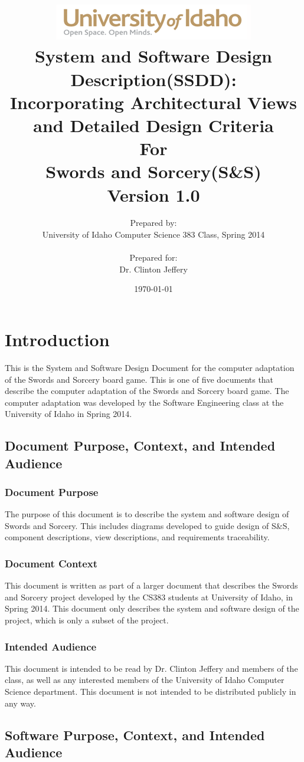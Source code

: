 \documentclass[12pt,a4paper,titlepage]{article}
\title{ 
\center\includegraphics[width=\linewidth]{UIGraphic}\\
		\center\textbf{\Large{System and Software Design Description(SSDD):}\\
		\large{Incorporating Architectural Views and Detailed Design Criteria\\
		For\\
		\large{Swords and Sorcery(S\&S)}}\\
		Version 1.0}}
\author{Prepared by:\\University of Idaho Computer Science 383 Class, Spring 2014\\
\bigskip\\
Prepared for:\\
Dr. Clinton Jeffery\\}
\date{\today}
\begin{document}
\maketitle
\pagebreak
\setcounter{tocdepth}{3}
\renewcommand\contentsname{\center{Swords and Sorcery Design\\Table of Contents}}
\tableofcontents
\pagebreak

\section{Introduction}
This is the System and Software Design Document for the computer adaptation of the Swords and Sorcery board game. This is one of five documents that describe the computer adaptation of the Swords and Sorcery board game. The computer adaptation was developed by the Software Engineering class at the University of Idaho in Spring 2014.
\subsection{Document Purpose, Context, and Intended Audience}
\subsubsection{Document Purpose}
The purpose of this document is to describe the system and software design of Swords and Sorcery. This includes diagrams developed to guide design of S\&S, component descriptions, view descriptions, and requirements traceability.
\subsubsection{Document Context}
This document is written as part of a larger document that describes the Swords and Sorcery project developed by the CS383 students at University of Idaho, in Spring 2014. This document only describes the system and software design of the project, which is only a subset of the project.
\subsubsection{Intended Audience}
This document is intended to be read by Dr. Clinton Jeffery and members of the class, as well as any interested members of the University of Idaho Computer Science department. This document is not intended to be distributed publicly in any way.
\subsection{Software Purpose, Context, and Intended Audience}
\end{document}
